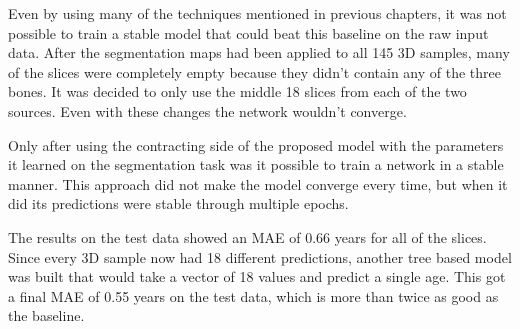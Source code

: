 Even by using many of the techniques mentioned in previous chapters, it was not possible to train a stable model that could beat this baseline on the raw input data. After the segmentation maps had been applied to all 145 3D samples, many of the slices were completely empty because they didn't contain any of the three bones. It was decided to only use the middle 18 slices from each of the two sources. Even with these changes the network wouldn't converge.

Only after using the contracting side of the proposed model with the parameters it learned on the segmentation task was it possible to train a network in a stable manner. This approach did not make the model converge every time, but when it did its predictions were stable through multiple epochs.

The results on the test data showed an MAE of 0.66 years for all of the slices. Since every 3D sample now had 18 different predictions, another tree based model was built that would take a vector of 18 values and predict a single age. This got a final MAE of 0.55 years on the test data, which is more than twice as good as the baseline.

\newpage